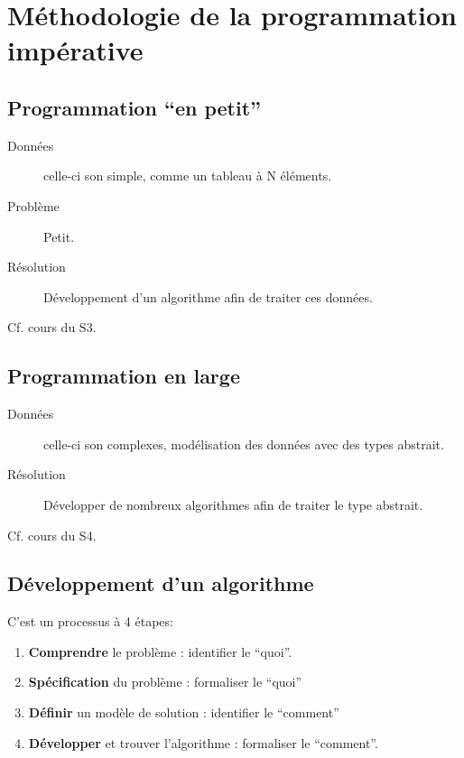 	\chapter{Méthodologie de la programmation impérative}
		\section{Programmation ``en petit''}
		\begin{description}
			\item[Données] celle-ci son simple, comme un tableau à N éléments.
			\item[Problème] Petit.
			\item[Résolution] Développement d'un algorithme afin de traiter ces données.
		\end{description}
		Cf. cours du S3.

		\section{Programmation en large}
		\begin{description}
			\item[Données] celle-ci son complexes, modélisation des données avec des types abstrait.
			\item[Résolution] Développer de nombreux algorithmes afin de traiter le type abstrait. 
		\end{description}
		Cf. cours du S4.
		\section{Développement d'un algorithme}
		C'est un processus à 4 étapes:
		\begin{enumerate}
			\item \textbf{Comprendre} le problème : identifier le ``quoi''.
			\item \textbf{Spécification} du problème : formaliser le ``quoi''
			\item \textbf{Définir} un modèle de solution : identifier le ``comment''
			\item \textbf{Développer} et trouver l'algorithme : formaliser le ``comment''.
		\end{enumerate}

